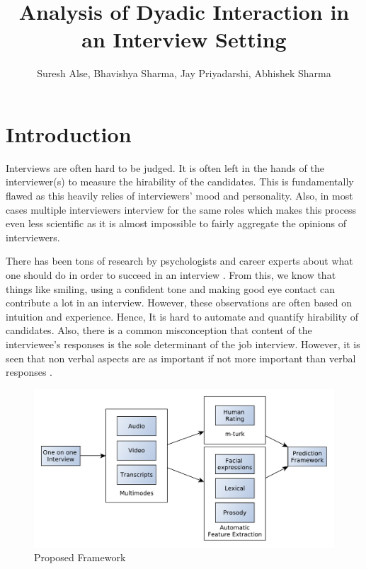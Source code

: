 \documentclass[11pt]{article}
\begin{document}
\title{Analysis of Dyadic Interaction in an Interview Setting}

 \author{Suresh Alse, Bhavishya Sharma, Jay Priyadarshi, Abhishek Sharma}

\maketitle




\nocite{*}
\section{Introduction}
Interviews are often hard to be judged. It is often left in the hands of the interviewer(s) to measure the hirability of the candidates. This is fundamentally flawed as this heavily relies of interviewers' mood and personality. Also, in most cases multiple interviewers interview for the same roles which makes this process even less scientific as it is almost impossible to fairly aggregate the opinions of interviewers.

There has been tons of research by psychologists and career experts about what one should do in order to succeed in an interview \cite{huffcutt2001identification}. From this, we know that things like smiling, using a confident tone and making good eye contact can contribute a lot in an interview. However, these observations are often based on intuition and experience. Hence, It is hard to automate and quantify hirability of candidates. Also, there is a common misconception that content of the interviewee's responses is the sole determinant of the job interview. However, it is seen that non verbal aspects are as important if not more important than verbal responses \cite{mehrabian1971silent}.

\begin{figure}[h!]
\begin{center}
\includegraphics[width=0.7\columnwidth]{figures/process1/process1}
\caption{{Proposed Framework%
}}
\end{center}
\end{figure}
\end{document}
